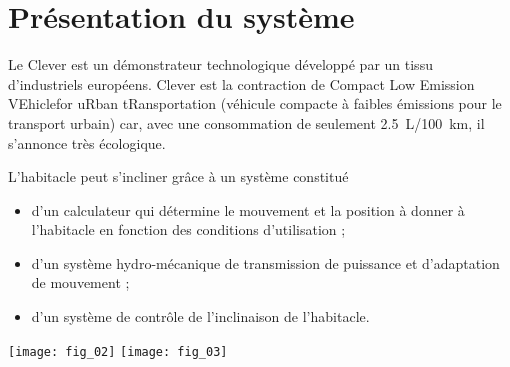 \normaltrue \difficilefalse \tdifficilefalse
\correctionfalse




\setcounter{question}{0}
\ifcorrection
\else
{}
\fi

\ifprof
\else
\section*{Présentation du système}

Le Clever est un démonstrateur technologique développé par un tissu d'industriels européens. Clever est la contraction de Compact Low Emission VEhiclefor uRban tRansportation (véhicule compacte à faibles émissions pour le transport urbain) car, avec une consommation de seulement \SI{2,5}{L}/\SI{100}{km}, il s'annonce très écologique. 

L'habitacle peut s'incliner grâce à un système constitué 
\begin{itemize}
\item d'un calculateur qui détermine le mouvement et la position à donner à l'habitacle en fonction des conditions d'utilisation ;
\item d'un système hydro-mécanique de transmission de puissance et d'adaptation de mouvement ;
\item d'un système de contrôle de l'inclinaison de l'habitacle.
\end{itemize}

\begin{center}
\texttt{[image: fig\_02]}
\texttt{[image: fig\_03]}
\end{center}

